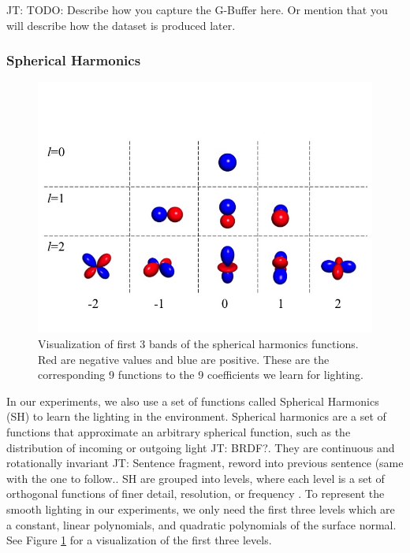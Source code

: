 \documentclass[10pt,twocolumn,letterpaper]{article}
\newcommand{\tompson}[1]{{\color{green} JT: #1}}
\begin{document}
\tompson{TODO: Describe how you capture the G-Buffer here. Or mention that you will describe how the dataset is produced later.}

\subsubsection{Spherical Harmonics}
\begin{figure}[h!]
\centering
\includegraphics[width=1.0\columnwidth]{./assets/SH_Fig.jpg}
\caption{Visualization of first 3 bands of the spherical harmonics functions. Red are negative values and blue are positive. These are the corresponding 9 functions to the 9 coefficients we learn for lighting.}
\label{fig:SHBands01}
\end{figure}
In our experiments, we also use a set of functions called Spherical Harmonics (SH) to learn the lighting in the environment. Spherical harmonics are a set of functions that approximate an arbitrary spherical function, such as the distribution of incoming or outgoing light \cite{Ramamoorthi:2001:ERI:383259.383317} \tompson{BRDF?}. They are continuous and rotationally invariant \tompson{Sentence fragment, reword into previous sentence (same with the one to follow.}. SH are grouped into levels, where each level is a set of orthogonal functions of finer detail, resolution, or frequency \cite{Shreiner:2013:OPG:2544032}.  To represent the smooth lighting in our experiments, we only need the first three levels which are a constant, linear polynomials, and quadratic polynomials of the surface normal. See Figure \ref{fig:SHBands01} for a visualization of the first three levels.\\%
\end{document}
